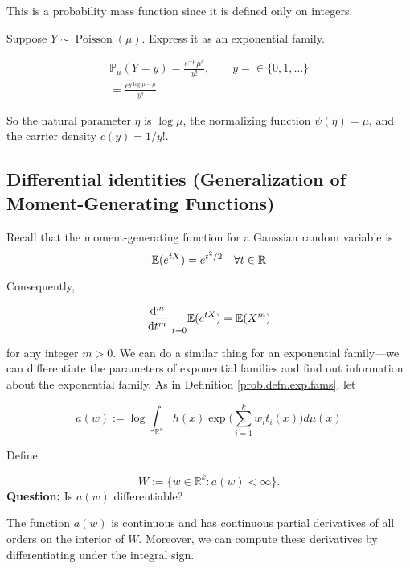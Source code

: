 \begin{remark} This is a probability mass function since it is defined only on integers.

\end{remark}

\begin{example} Suppose \(Y \sim \operatorname{Poisson}(\mu)\). Express it as an exponential family.

\end{example}

\begin{solution}

\begin{multline*}
\mathbb{P}_\mu (Y =y) = \frac{ e^{-\mu} \mu^y}{y!}, \qquad y = \in \{0, 1, \ldots\} 
\\ = \frac{e^{y \log \mu - \mu}}{y!} 
\end{multline*}

So the natural parameter \(\eta\) is \(\log \mu\), the normalizing function \(\psi(\eta) = \mu\), and the carrier density \(c(y) = 1 /y!\).



\end{solution}

\subsection{Differential identities (Generalization of Moment-Generating Functions)} Recall that the moment-generating function for a Gaussian random variable is 
\[
\E(e^{tX}) = e^{t^2/2} \ \ \ \forall t \in \mathbb{R}
\]

Consequently,

\[
\frac{\mathrm{d} ^m}{\mathrm{d} t^m} \bigg|_{t=0} \mathbb{E}(e^{tX}) = \mathbb{E}(X^m)
\]

for any integer \(m > 0\). We can do a similar thing for an exponential family---we can differentiate the parameters of exponential families and find out information about the exponential family. As in Definition \ref{prob.defn.exp.fams}, let 

\[
a(w) := \log \int_{\mathbb{R}^n} h(x) \exp \bigg(\sum_{i=1}^k w_i t_i(x) \bigg) d\mu(x)
\]

Define 

\[
W:= \{w \in \mathbb{R}^k : a(w) < \infty\}.
\]
\textbf{Question:} Is \(a(w)\) differentiable?

\begin{lemma} \label{prob.541a.lemma.3.8}The function \(a(w)\) is continuous and has continuous partial derivatives of all orders on the interior of \(W\). Moreover, we can compute these derivatives by differentiating under the integral sign.

\end{lemma}

